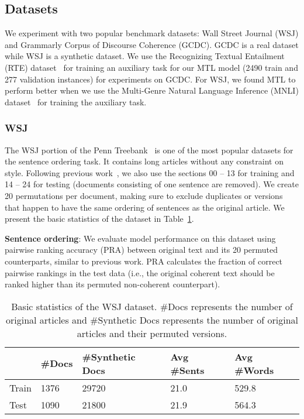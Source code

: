 \documentclass[11pt]{article}
\begin{document}
\subsection{Datasets}
We experiment with two popular benchmark datasets: Wall Street Journal (WSJ) and Grammarly Corpus of Discourse Coherence (GCDC). GCDC is a real dataset while WSJ is a synthetic dataset. We use the Recognizing Textual Entailment (RTE) dataset~\cite{wang2019superglue} for training an auxiliary task for our MTL model (2490 train and 277 validation  instances) for experiments on GCDC. For WSJ, we found MTL to perform better when we use the Multi-Genre Natural Language Inference (MNLI) dataset~\cite{N18-1101} for training the auxiliary task.

\subsubsection{WSJ} 
The WSJ portion of the Penn Treebank~\cite{elsner2008coreference,nguyen2017neural} is one of the most popular datasets for the sentence ordering task. It contains long articles without any constraint on style. Following previous work~\cite{barzilay2008modeling,nguyen2017neural}, we also use the sections 00 -- 13 for training and 14 -- 24 for testing (documents consisting of one sentence are removed). We create 20 permutations per document, making sure to exclude duplicates or versions that happen to have the same ordering of sentences as the original article. We present the basic statistics of the dataset in Table~\ref{tab:wsjStats}. 

\noindent\textbf{Sentence ordering}: We evaluate model performance on this dataset using pairwise ranking accuracy (PRA) between original text and its 20 permuted counterparts, similar to previous work. PRA calculates the fraction of correct pairwise rankings in the test data (i.e., the original coherent text should be ranked higher than its permuted non-coherent counterpart).  

\setlength{\tabcolsep}{4pt}
\begin{table}
    \centering
    \scriptsize
    \begin{tabular}{|l|l|l|l|l|}
\hline
&\#Docs&\#Synthetic Docs&Avg \#Sents&Avg \#Words\\
\hline
Train&1376&29720&21.0&529.8\\
\hline
Test&1090&21800&21.9&564.3\\
\hline
\end{tabular}
    \caption{Basic statistics of the WSJ dataset. \#Docs represents the number of original articles and \#Synthetic Docs represents the number of original articles and their permuted versions.}
    \label{tab:wsjStats}
\end{table}
\end{document}
